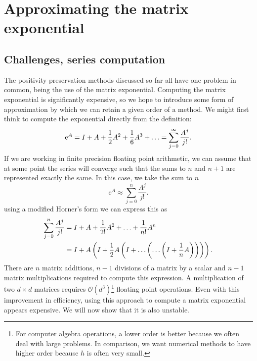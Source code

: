 
\section{Approximating the matrix exponential}

\subsection{Challenges, series computation}

The positivity preservation methods discussed so far all have one problem in common, being the use of the matrix exponential.
Computing the matrix exponential is significantly expensive, so we hope to introduce some form of approximation by which we can retain a given order of a method.
We might first think to compute the exponential directly from the definition:
\begin{equation*}
    \mathrm{e}^A = I + A + \frac{1}{2}A^2 + \frac{1}{6}A^3 + \mathellipsis = \sum_{j=0}^{\infty} \frac{A^j}{j!}.
\end{equation*}
If we are working in finite precision floating point arithmetic, we can assume that at some point the series will converge such that the sums to $n$ and $n+1$ are represented exactly the same.
In this case, we take the sum to $n$
\begin{equation*}
    \mathrm{e}^A \approx \sum_{j = 0}^{n} \frac{A^j}{j!}.
\end{equation*}
using a modified Horner's form we can express this as
\begin{align*}
	\sum_{j = 0}^{n} \frac{A^j}{j!} &= I + A + \frac{1}{2!}A^2 + \mathellipsis + \frac{1}{n!} A^n \\
	&= I + A\left(
	I + \frac{1}{2} A\left(
			I + \mathellipsis\left(
				\mathellipsis \left( I + \frac{1}{n} A
				\right)
			\right)
		\right)
	\right).
\end{align*}
There are $n$ matrix additions, $n-1$ divisions of a matrix by a scalar and $n-1$ matrix multiplications required to compute this expression.
A multiplication of two $d \times d$ matrices requires $\mathcal{O}(d^3)$\footnote{
    For computer algebra operations, a lower order is better because we often deal with large problems.
    In comparison, we want numerical methods to have higher order because $h$ is often very small.
} floating point operations.
Even with this improvement in efficiency, using this approach to compute a matrix exponential appears expensive.
We will now show that it is also unstable.

